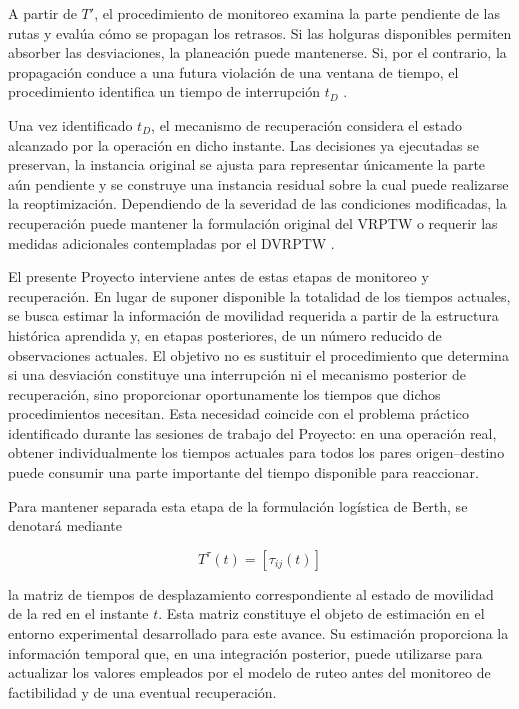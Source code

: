 \documentclass[11pt]{article}
\begin{document}
A partir de $T'$, el procedimiento de monitoreo examina la parte pendiente de las rutas y evalúa cómo se propagan los retrasos. Si las holguras disponibles permiten absorber las desviaciones, la planeación puede mantenerse. Si, por el contrario, la propagación conduce a una futura violación de una ventana de tiempo, el procedimiento identifica un tiempo de interrupción $t_D$ \parencite{berth_thesis_2025,berth_trigos_2025}.

Una vez identificado $t_D$, el mecanismo de recuperación considera el estado alcanzado por la operación en dicho instante. Las decisiones ya ejecutadas se preservan, la instancia original se ajusta para representar únicamente la parte aún pendiente y se construye una instancia residual sobre la cual puede realizarse la reoptimización. Dependiendo de la severidad de las condiciones modificadas, la recuperación puede mantener la formulación original del VRPTW o requerir las medidas adicionales contempladas por el DVRPTW \parencite{berth_thesis_2025,berth_trigos_2025}.

El presente Proyecto interviene antes de estas etapas de monitoreo y recuperación. En lugar de suponer disponible la totalidad de los tiempos actuales, se busca estimar la información de movilidad requerida a partir de la estructura histórica aprendida y, en etapas posteriores, de un número reducido de observaciones actuales. El objetivo no es sustituir el procedimiento que determina si una desviación constituye una interrupción ni el mecanismo posterior de recuperación, sino proporcionar oportunamente los tiempos que dichos procedimientos necesitan. Esta necesidad coincide con el problema práctico identificado durante las sesiones de trabajo del Proyecto: en una operación real, obtener individualmente los tiempos actuales para todos los pares origen--destino puede consumir una parte importante del tiempo disponible para reaccionar.

Para mantener separada esta etapa de la formulación logística de Berth, se denotará mediante

\[
T^{\tau}(t)=\left[\tau_{ij}(t)\right]
\]

la matriz de tiempos de desplazamiento correspondiente al estado de movilidad de la red en el instante $t$. Esta matriz constituye el objeto de estimación en el entorno experimental desarrollado para este avance. Su estimación proporciona la información temporal que, en una integración posterior, puede utilizarse para actualizar los valores empleados por el modelo de ruteo antes del monitoreo de factibilidad y de una eventual recuperación.
\end{document}

